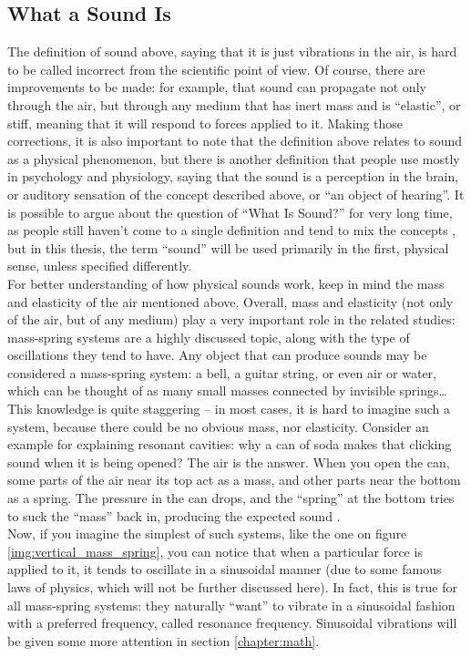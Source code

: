 \subsection{What a Sound Is}\label{section:physics_sound}

The definition of sound above, saying that it is just vibrations in the air, is hard to be called incorrect from the scientific point of view. Of course, there are improvements to be made: for example, that sound can propagate not only through the air, but through any medium that has inert mass and is “elastic”, or stiff, meaning that it will respond to forces applied to it. Making those corrections, it is also important to note that the definition above relates to sound as a physical phenomenon, but there is another definition that people use mostly in psychology and physiology, saying that the sound is a perception in the brain, or auditory sensation of the concept described above, or “an object of hearing”. It is possible to argue about the question of “What Is Sound?” for very long time, as people still haven’t come to a single definition and tend to mix the concepts \cite{Pasnau1999}, but in this thesis, the term “sound” will be used primarily in the first, physical sense, unless specified differently.\\

For better understanding of how physical sounds work, keep in mind the mass and elasticity of the air mentioned above. Overall, mass and elasticity (not only of the air, but of any medium) play a very important role in the related studies: mass-spring systems are a highly discussed topic, along with the type of oscillations they tend to have. Any object that can produce sounds may be considered a mass-spring system: a bell, a guitar string, or even air or water, which can be thought of as many small masses connected by invisible springs\dots{} This knowledge is quite staggering -- in most cases, it is hard to imagine such a system, because there could be no obvious mass, nor elasticity. Consider an example for explaining resonant cavities: why a can of soda makes that clicking sound when it is being opened? The air is the answer. When you open the can, some parts of the air near its top act as a mass, and other parts near the bottom as a spring. The pressure in the can drops, and the “spring” at the bottom tries to suck the “mass” back in, producing the expected sound \cite{Schnupp2011}.\\

Now, if you imagine the simplest of such systems, like the one on figure \ref{img:vertical_mass_spring}, you can notice that when a particular force is applied to it, it tends to oscillate in a sinusoidal manner (due to some famous laws of physics, which will not be further discussed here). In fact, this is true for all mass-spring systems: they naturally “want” to vibrate in a sinusoidal fashion with a preferred frequency, called resonance frequency. Sinusoidal vibrations will be given some more attention in section \ref{chapter:math}.\\

